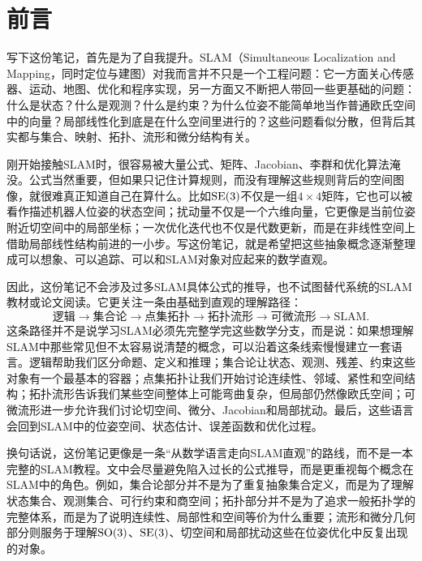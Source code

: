 \chapter*{前言}



写下这份笔记，首先是为了自我提升。SLAM（Simultaneous Localization and Mapping，同时定位与建图）对我而言并不只是一个工程问题：它一方面关心传感器、运动、地图、优化和程序实现，另一方面又不断把人带回一些更基础的问题：什么是状态？什么是观测？什么是约束？为什么位姿不能简单地当作普通欧氏空间中的向量？局部线性化到底是在什么空间里进行的？这些问题看似分散，但背后其实都与集合、映射、拓扑、流形和微分结构有关。

刚开始接触SLAM时，很容易被大量公式、矩阵、Jacobian、李群和优化算法淹没。公式当然重要，但如果只记住计算规则，而没有理解这些规则背后的空间图像，就很难真正知道自己在算什么。比如$\operatorname{SE}(3)$不仅是一组$4\times4$矩阵，它也可以被看作描述机器人位姿的状态空间；扰动量不仅是一个六维向量，它更像是当前位姿附近切空间中的局部坐标；一次优化迭代也不仅是代数更新，而是在非线性空间上借助局部线性结构前进的一小步。写这份笔记，就是希望把这些抽象概念逐渐整理成可以想象、可以追踪、可以和SLAM对象对应起来的数学直观。

因此，这份笔记不会涉及过多SLAM具体公式的推导，也不试图替代系统的SLAM教材或论文阅读。它更关注一条由基础到直观的理解路径：
\[
    \text{逻辑}
    \longrightarrow
    \text{集合论}
    \longrightarrow
    \text{点集拓扑}
    \longrightarrow
    \text{拓扑流形}
    \longrightarrow
    \text{可微流形}
    \longrightarrow
    \text{SLAM}.
\]
这条路径并不是说学习SLAM必须先完整学完这些数学分支，而是说：如果想理解SLAM中那些常见但不太容易说清楚的概念，可以沿着这条线索慢慢建立一套语言。逻辑帮助我们区分命题、定义和推理；集合论让状态、观测、残差、约束这些对象有一个最基本的容器；点集拓扑让我们开始讨论连续性、邻域、紧性和空间结构；拓扑流形告诉我们某些空间整体上可能弯曲复杂，但局部仍然像欧氏空间；可微流形进一步允许我们讨论切空间、微分、Jacobian和局部扰动。最后，这些语言会回到SLAM中的位姿空间、状态估计、误差函数和优化过程。

换句话说，这份笔记更像是一条“从数学语言走向SLAM直观”的路线，而不是一本完整的SLAM教程。文中会尽量避免陷入过长的公式推导，而是更重视每个概念在SLAM中的角色。例如，集合论部分并不是为了重复抽象集合定义，而是为了理解状态集合、观测集合、可行约束和商空间；拓扑部分并不是为了追求一般拓扑学的完整体系，而是为了说明连续性、局部性和空间等价为什么重要；流形和微分几何部分则服务于理解$\operatorname{SO}(3)$、$\operatorname{SE}(3)$、切空间和局部扰动这些在位姿优化中反复出现的对象。

